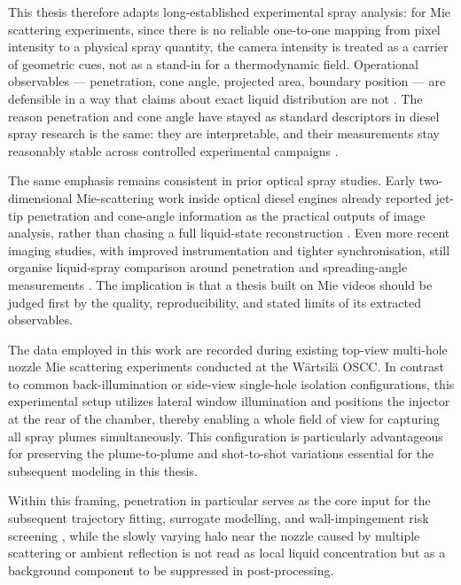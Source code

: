 \documentclass[english, 12pt, a4paper, elec, utf8, a-2b, online]{aaltothesis}
\begin{document}
This thesis therefore adapts long-established experimental spray analysis: 
for Mie scattering experiments, since there is no reliable one-to-one mapping from pixel intensity to a physical spray quantity,
the camera intensity is treated as a carrier of geometric cues, not as a stand-in for a thermodynamic field. 
Operational observables --- penetration, cone angle, projected area, boundary position --- 
are defensible in a way that claims about exact liquid distribution are not \cite{Linne2013SprayImaging,LefebvreMcDonell2017}. 
The reason penetration and cone angle have stayed as standard descriptors in diesel spray research is the same: 
they are interpretable, and their measurements stay reasonably stable across controlled experimental campaigns 
\cite{Dent1971Penetration,HiroyasuArai1990,NaberSiebers1996}.

The same emphasis remains consistent in prior optical spray studies. 
Early two-dimensional Mie-scattering work inside optical diesel engines already reported jet-tip penetration and cone-angle information 
as the practical outputs of image analysis, rather than chasing a full liquid-state reconstruction \cite{MuenchLeipertz1992}. 
Even more recent imaging studies, with improved instrumentation and tighter synchronisation, 
still organise liquid-spray comparison around penetration and spreading-angle measurements \cite{JungManinSkeenPickett2015}. 
The implication is that a thesis built on Mie videos should be judged first by the quality, reproducibility, 
and stated limits of its extracted observables.

The data employed in this work are recorded during existing top-view multi-hole nozzle Mie scattering experiments conducted at the Wärtsilä OSCC. 
In contrast to common back-illumination or side-view single-hole isolation configurations, 
this experimental setup utilizes lateral window illumination and positions the injector at the rear of the chamber, 
thereby enabling a whole field of view for capturing all spray plumes simultaneously. 
This configuration is particularly advantageous for preserving the plume-to-plume and shot-to-shot variations essential for the subsequent modeling in this thesis.

Within this framing, penetration in particular serves as the core input for the subsequent trajectory fitting, surrogate modelling, and wall-impingement risk screening
\cite{Linne2013SprayImaging,LefebvreMcDonell2017,Dent1971Penetration,HiroyasuArai1990,NaberSiebers1996},
while the slowly varying halo near the nozzle caused by multiple scattering or ambient reflection is not read as local liquid concentration but as a background component to be suppressed in post-processing.
\end{document}

